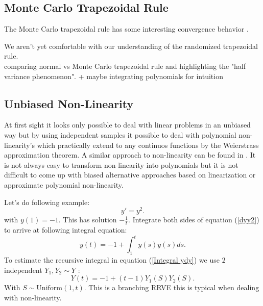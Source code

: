 \documentclass[a4paper,12pt]{article}
\begin{document}
\vspace*{0.2cm}
\begin{pythonn}
\end{pythonn}

\begin{comment}
Introduces Russian roulette, splitting, control variates, importance sampling and maybe quasi Monte Carlo with the
$y'=y$ example. We are missing importance sampling and quasi MC
\end{comment}


\subsection{Monte Carlo Trapezoidal Rule}
The Monte Carlo trapezoidal rule has some interesting convergence
behavior \cite{wu_randomised_2020}.

We aren't yet comfortable with our understanding of the randomized trapezoidal rule. \\
comparing normal vs Monte Carlo trapezoidal rule and highlighting the "half variance phenomenon".
+ maybe integrating polynomials for intuition

\subsection{Unbiased Non-Linearity}
At first sight it looks only possible to deal with linear problems in an unbiased way but by using
independent samples it possible to deal with polynomial non-linearity's which practically extend
to any continuos functions by the Weierstrass approximation theorem. A similar approach to
non-linearity can be found in \cite{ermakov_monte_2019}. It is not always easy to
transform non-linearity into polynomials but it is not difficult to come up with
biased alternative approaches based on linearization or approximate polynomial non-linearity.


\begin{example}[$y'=y^{2}$]
    Let's do following example:
    \begin{equation} \label{dyy2}
        y'= y^2.
    \end{equation}
    with $y(1)=-1$. This has solution $-\frac{1}{t}$. Integrate both sides of
    equation (\ref{dyy2}) to arrive at following integral equation:
    \begin{equation} \label{Integral dyy2}
        y(t) = -1 + \int_{1}^{t} y(s) y(s) ds .
    \end{equation}
    To estimate the recursive integral in equation (\ref{Integral ydy}) we use $2$
    independent $Y_{1},Y_{2}\sim Y$ :
    \[
        Y(t) = -1 + (t-1) Y_{1}(S) Y_{2}(S)
        .\]
    With $S \sim \text{Uniform}(1,t)$. This is a branching RRVE this is
    typical when dealing with non-linearity.
\end{example}
\end{document}

